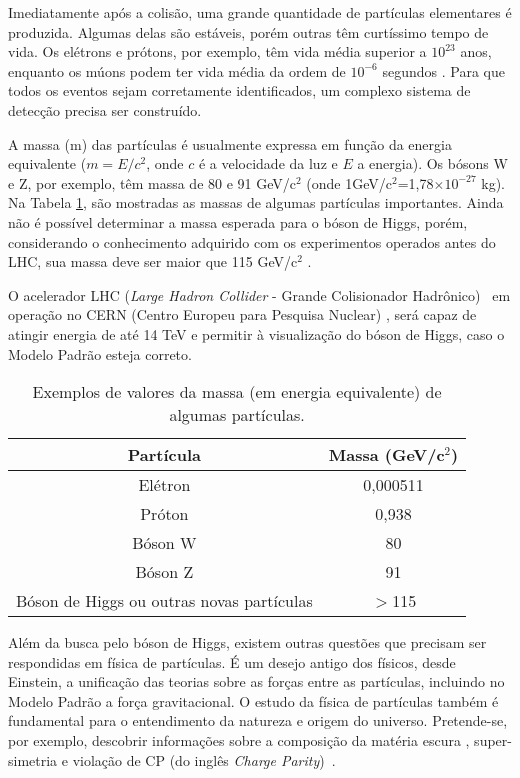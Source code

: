 Imediatamente após a colisão, uma grande quantidade de partículas
elementares é produzida. Algumas delas são estáveis, porém outras
têm curtíssimo tempo de vida. Os elétrons e prótons, por exemplo,
têm vida média superior a $10^{23}$ anos, enquanto os múons podem
ter vida média da ordem de $10^{-6}$ segundos
\cite{book:chung:2001}. Para que todos os eventos sejam corretamente
identificados, um complexo sistema de detecção precisa ser
construído.

A massa (m) das partículas é usualmente expressa em função da
energia equi\-va\-lente ($m=E/c^2$, onde $c$ é a velocidade da luz e
$E$ a energia). Os bósons W e Z, por exemplo, têm massa de 80 e 91
GeV/c$^2$ (onde 1GeV/c$^2$=1,78$\times 10^{-27}$ kg). Na Tabela
\ref{tab_massa}, são mostradas as massas de algumas partículas
importantes. Ainda não é possível determinar a massa esperada para o
bóson de Higgs, porém, considerando o conhe\-ci\-men\-to adquirido
com os experimentos operados antes do LHC, sua massa deve ser
maior que 115 GeV/c$^2$ \cite{livro:fisica1:2006}.

O acelerador LHC (\textit{Large Hadron Collider} - Grande
Colisionador Hadrônico)~\cite{article:LHC:2008,article:LHC:2002} em
operação no CERN (Centro Europeu para Pesquisa Nuclear)
\cite{Homepage:CERN}, será capaz de atingir energia de até 14 TeV e
permitir à visualização do bóson de Higgs, caso o Modelo Padrão
esteja correto.

\begin{table}[h!]
\centering
\begin{tabular}{cc }
  \hline
  \textbf{Partícula} & \textbf{Massa (GeV/c$^2$)} \\  \hline
  Elétron  &  0,000511 \\
  Próton  & 0,938 \\
  Bóson W & 80 \\
  Bóson Z & 91 \\
  Bóson de Higgs ou outras novas partículas & $>$115 \\
  \hline
\end{tabular}
\caption{Exemplos de valores da massa (em energia equivalente) de
algumas partículas.} \label{tab_massa}
\end{table}

Além da busca pelo bóson de Higgs, existem outras questões que
precisam ser respondidas em física de partículas. É um desejo antigo dos físicos, desde
Einstein, a unificação das teorias sobre as forças entre as
partículas, incluindo no Modelo Padrão a força gravitacional. O
estudo da física de partículas também é fundamental para o
entendimento da natureza e origem do universo. Pretende-se, por
exemplo, descobrir informações sobre a composição da matéria escura
\cite{article:darkm:2005}, super-simetria \cite{article:susy:1996} e
violação de CP (do inglês \textit{Charge
Parity})~\cite{book:cpv:1999}.

